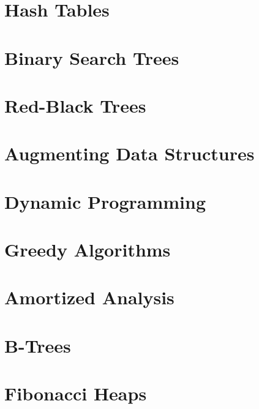 \documentclass{book}
\begin{document}
\chapter{Hash Tables}




\chapter{Binary Search Trees}




\chapter{Red-Black Trees}




\chapter{Augmenting Data Structures}




\chapter{Dynamic Programming}




\chapter{Greedy Algorithms}




\chapter{Amortized Analysis}




\chapter{B-Trees}




\chapter{Fibonacci Heaps}
\end{document}
